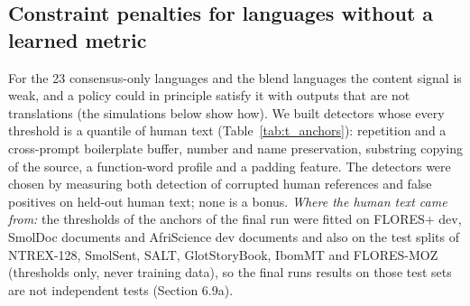 \subsection{Constraint penalties for languages without a learned metric}\label{constraint-penalties-for-languages-without-a-learned-metric}

For the 23 consensus-only languages and the blend languages the content signal is weak, and a policy could in principle satisfy it with outputs that are not translations (the simulations below show how). We built detectors whose every threshold is a quantile of human text (Table~\ref{tab:t_anchors}): repetition and a cross-prompt boilerplate buffer, number and name preservation, substring copying of the source, a function-word profile and a padding feature. The detectors were chosen by measuring both detection of corrupted human references and false positives on held-out human text; none is a bonus. \emph{Where the human text came from:} the thresholds of the anchors of the final run were fitted on FLORES+ dev, SmolDoc documents and AfriScience dev documents and also on the test splits of NTREX-128, SmolSent, SALT, GlotStoryBook, IbomMT and FLORES-MOZ (thresholds only, never training data), so the final run\textquotesingle s results on those test sets are not independent tests (Section 6.9a).

